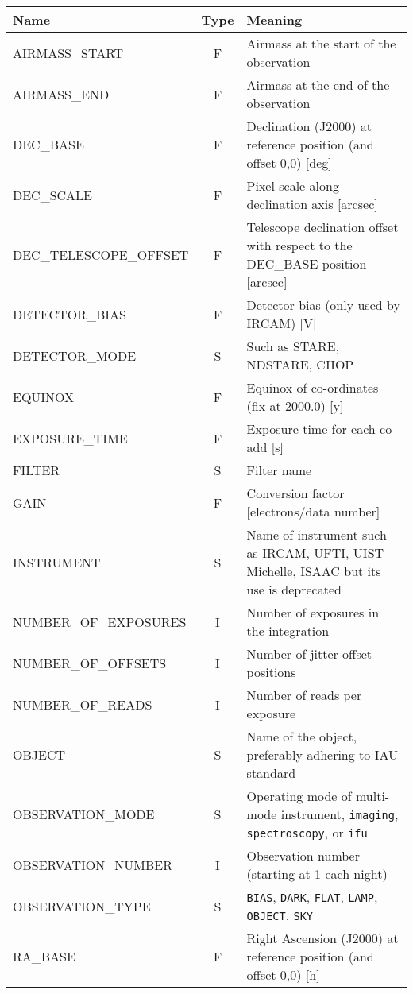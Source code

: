\documentclass[twoside,11pt,nolof]{starlink}
\begin{document}
\begin{center}
\begin{tabular}{lcp{80mm}}
Name                 & Type &  Meaning \\ \hline
AIRMASS\_START          & F &  Airmass at the start of the observation \\
AIRMASS\_END            & F &  Airmass at the end of the observation \\
DEC\_BASE               & F &  Declination (J2000) at reference position
                               (and offset 0,0) [deg] \\
DEC\_SCALE              & F &  Pixel scale along declination axis [arcsec] \\
DEC\_TELESCOPE\_OFFSET  & F &  Telescope declination offset with respect to
                               the DEC\_BASE position [arcsec] \\
DETECTOR\_BIAS          & F &  Detector bias (only used by IRCAM) [V] \\
DETECTOR\_MODE          & S &  Such as STARE, NDSTARE, CHOP \\
EQUINOX                 & F &  Equinox of co-ordinates (fix at 2000.0) [y] \\
EXPOSURE\_TIME          & F &  Exposure time for each co-add [s] \\
FILTER                  & S &  Filter name \\
GAIN                    & F &  Conversion factor [electrons/data number] \\
INSTRUMENT              & S &  Name of instrument such as IRCAM, UFTI, UIST
                               Michelle, ISAAC but its use is deprecated \\
NUMBER\_OF\_EXPOSURES   & I &  Number of exposures in the integration \\
NUMBER\_OF\_OFFSETS     & I &  Number of jitter offset positions \\
NUMBER\_OF\_READS       & I &  Number of reads per exposure \\
OBJECT                  & S &  Name of the object, preferably adhering
                               to IAU standard \\
OBSERVATION\_MODE       & S &  Operating mode of multi-mode instrument,
                               \texttt{imaging}, \texttt{spectroscopy}, or \texttt{ifu} \\
OBSERVATION\_NUMBER     & I &  Observation number (starting at 1 each night) \\
OBSERVATION\_TYPE       & S &  \texttt{BIAS}, \texttt{DARK}, \texttt{FLAT}, \texttt{LAMP},
                               \texttt{OBJECT}, \texttt{SKY} \\
RA\_BASE                & F &  Right Ascension (J2000) at reference
                               position (and offset 0,0) [h] \\
\end{tabular}
\end{center}
\end{document}
